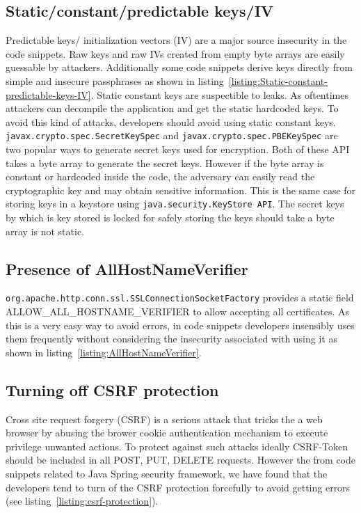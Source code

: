 \subsection{Static/constant/predictable keys/IV }
Predictable keys/ initialization vectors (IV) are a major source insecurity in the code snippets. 
Raw keys and raw IVs created from empty byte arrays
are easily guessable by attackers. 
Additionally some code snippets derive keys directly from simple and insecure passphrases as shown in listing~\ref{listing:Static-constant-predictable-keys-IV}. 
Static constant keys are suspectible to leaks. As oftentimes attackers can decompile the application and get the static hardcoded keys.  To avoid this kind of attacks, developers should avoid using static constant keys. \texttt{javax.crypto.spec.SecretKeySpec} and \texttt{javax.crypto.spec.\-PBEKeySpec} are two popular ways to generate secret keys used for encryption. Both of these API takes a byte array to generate the secret keys. However if the byte array is constant or hardcoded inside the code, the adversary can easily read the cryptographic key and may obtain sensitive information. This is the same case for storing keys in a keystore using \texttt{java.security.KeyStore API}. The secret keys by which is key stored is locked for safely storing the keys should take a byte array is not static.


\subsection{Presence of AllHostNameVerifier}
\texttt{org.apache.http.conn.ssl.SSLConnectionSocketFactory} provides  a static field ALLOW\_ALL\_HOSTNAME\_VERIFIER to allow accepting all certificates.  
As this is a very easy way to avoid errors, in code snippets developers insensibly uses them frequently without considering the insecurity associated with using it as shown in listing~\ref{listing:AllHostNameVerifier}.

\subsection{Turning off CSRF protection}
Cross site request forgery (CSRF) is a serious attack that tricks the a web browser by abusing the brower cookie authentication mechanism to execute privilege unwanted actions. To protect against such attacks ideally CSRF-Token should be included in all POST, PUT, DELETE requests.
However the from code snippets related to Java Spring security framework, we have found that the developers tend to turn of the CSRF protection forcefully to avoid getting errors (see listing~\ref{listing:csrf-protection}). 
